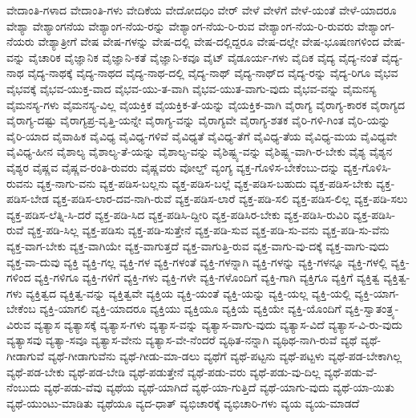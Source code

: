 {ವೇದಾಂತಿ-ಗಳಾದ
ವೇದಾಂತಿ-ಗಳು
ವೇದಿಕೆಯ
ವೇದೋದಧಿಂ
ವೇರ್
ವೇಳೆ
ವೇಳೆಗೆ
ವೇಳೆ-ಯಂತೆ
ವೇಳೆ-ಯಾದರೂ
ವೇಶ್ಯಾ
ವೇಶ್ಯಾಂಗನೆಯ
ವೇಶ್ಯಾಂಗ-ನೆಯ-ರನ್ನು
ವೇಶ್ಯಾಂಗ-ನೆಯ-ರಿ-ರುವ
ವೇಶ್ಯಾಂಗ-ನೆಯ-ರಿ-ರುವರು
ವೇಶ್ಯಾಂಗ-ನೆಯರು
ವೇಶ್ಯಾತ್ರೀಗೆ
ವೇಷ
ವೇಷ-ಗಳನ್ನು
ವೇಷ-ದಲ್ಲಿ
ವೇಷ-ದಲ್ಲಿದ್ದರೂ
ವೇಷ-ದಲ್ಲೇ
ವೇಷ-ಭೂಷಣಗಳಿಂದ
ವೇಷ-ವನ್ನು
ವೈಚಾರಿಕ
ವೈಜ್ಞಾನಿಕ
ವೈಜ್ಞಾನಿ-ಕತೆ
ವೈಜ್ಞಾನಿ-ಕವೂ
ವೈಟ್‌
ವೈಡೂರ್ಯ-ಗಳು
ವೈದಿಕ
ವೈದ್ಯ
ವೈದ್ಯ-ನಂತೆ
ವೈದ್ಯ-ನಾಥ
ವೈದ್ಯ-ನಾಥಕ್ಕೆ
ವೈದ್ಯ-ನಾಥದ
ವೈದ್ಯ-ನಾಥ-ದಲ್ಲಿ
ವೈದ್ಯ-ನಾಥ್
ವೈದ್ಯ-ನಾಥ್‌ದ
ವೈದ್ಯ-ರನ್ನು
ವೈದ್ಯ-ರಿಗೂ
ವೈಭವ
ವೈಭವಕ್ಕೆ
ವೈಭವ-ಯುಕ್ತ-ವಾದ
ವೈಭವ-ಯು-ತ-ವಾಗಿ
ವೈಭವ-ಯುತ-ವಾಗು-ವುದು
ವೈಭವ-ವನ್ನು
ವೈಮನಸ್ಯ
ವೈಮನಸ್ಯ-ಗಳು
ವೈಮನಸ್ಯ-ವಿಲ್ಲ
ವೈಯಕ್ತಿಕ
ವೈಯಕ್ತಿಕ-ತೆ-ಯನ್ನು
ವೈಯಕ್ತಿಕ-ವಾಗಿ
ವೈರಾಗ್ಯ
ವೈರಾಗ್ಯ-ಕಾರಕ
ವೈರಾಗ್ಯದ
ವೈರಾಗ್ಯ-ದಷ್ಟು
ವೈರಾಗ್ಯಪ್ರ-ವೃತ್ತಿ-ಯನ್ನೇ
ವೈರಾಗ್ಯ-ವನ್ನು
ವೈರಾಗ್ಯವೇ
ವೈರಾಗ್ಯ-ಶತಕ
ವೈರಿ-ಗಳಿ-ಗಿಂತ
ವೈರಿ-ಯನ್ನು
ವೈರಿ-ಯಾದ
ವೈವಾಹಿಕ
ವೈವಿಧ್ಯ
ವೈವಿಧ್ಯ-ಗಳಿವೆ
ವೈವಿಧ್ಯತೆ
ವೈವಿಧ್ಯ-ತೆಗೆ
ವೈವಿಧ್ಯ-ತೆಯ
ವೈವಿಧ್ಯ-ಮಯ
ವೈವಿಧ್ಯವೇ
ವೈವಿಧ್ಯ-ಹೀನ
ವೈಶಾಲ್ಯ
ವೈಶಾಲ್ಯ-ತೆ-ಯನ್ನು
ವೈಶಾಲ್ಯ-ವನ್ನು
ವೈಶಿಷ್ಟ್ಯ-ವನ್ನು
ವೈಶಿಷ್ಟ್ಯ-ವಾಗಿ-ರ-ಬೇಕು
ವೈಶ್ಯ
ವೈಶ್ಯನ
ವೈಶ್ಯರ
ವೈಷ್ಣವ
ವೈಷ್ಣವ-ರಂತಿ-ರುವರು
ವೈಷ್ಣವರು
ವೋಲ್ಡ್
ವ್ಯಂಗ್ಯ
ವ್ಯಕ್ತ-ಗೊಳಿಸ-ಬೇಕೆಂಬು-ದನ್ನು
ವ್ಯಕ್ತ-ಗೊಳಿಸಿ-ರುವನು
ವ್ಯಕ್ತ-ನಾಗು-ವನು
ವ್ಯಕ್ತ-ಪಡಿಸ-ಬಲ್ಲನು
ವ್ಯಕ್ತ-ಪಡಿಸ-ಬಲ್ಲೆ
ವ್ಯಕ್ತ-ಪಡಿಸ-ಬಹುದು
ವ್ಯಕ್ತ-ಪಡಿಸ-ಬೇಕು
ವ್ಯಕ್ತ-ಪಡಿಸ-ಬೇಡ
ವ್ಯಕ್ತ-ಪಡಿಸ-ಲಾರ-ದವ-ನಾಗಿ-ರುವೆ
ವ್ಯಕ್ತ-ಪಡಿಸ-ಲಾರೆ
ವ್ಯಕ್ತ-ಪಡಿ-ಸಲಿ
ವ್ಯಕ್ತ-ಪಡಿಸ-ಲಿಲ್ಲ
ವ್ಯಕ್ತ-ಪಡಿ-ಸಲು
ವ್ಯಕ್ತ-ಪಡಿಸ-ಲೆತ್ನಿ-ಸಿ-ದರೆ
ವ್ಯಕ್ತ-ಪಡಿ-ಸಿದ
ವ್ಯಕ್ತ-ಪಡಿಸಿ-ದ್ದೀರಿ
ವ್ಯಕ್ತ-ಪಡಿಸಿರ-ಬೇಕು
ವ್ಯಕ್ತ-ಪಡಿಸಿ-ರುವಿರಿ
ವ್ಯಕ್ತ-ಪಡಿಸಿ-ರುವೆ
ವ್ಯಕ್ತ-ಪಡಿ-ಸಿಲ್ಲ
ವ್ಯಕ್ತ-ಪಡಿಸು
ವ್ಯಕ್ತ-ಪಡಿ-ಸುತ್ತೇನೆ
ವ್ಯಕ್ತ-ಪಡಿ-ಸುವ
ವ್ಯಕ್ತ-ಪಡಿ-ಸು-ವನು
ವ್ಯಕ್ತ-ಪಡಿ-ಸು-ವೆನು
ವ್ಯಕ್ತ-ವಾಗ-ಬೇಕು
ವ್ಯಕ್ತ-ವಾಗಿಯೇ
ವ್ಯಕ್ತ-ವಾಗುತ್ತದೆ
ವ್ಯಕ್ತ-ವಾಗುತ್ತಿ-ರುವ
ವ್ಯಕ್ತ-ವಾಗು-ವು-ದಕ್ಕೆ
ವ್ಯಕ್ತ-ವಾಗು-ವುದು
ವ್ಯಕ್ತ-ವಾ-ದುವು
ವ್ಯಕ್ತಿ
ವ್ಯಕ್ತಿ-ಗಲ್ಲ
ವ್ಯಕ್ತಿ-ಗಳ
ವ್ಯಕ್ತಿ-ಗಳಂತೆ
ವ್ಯಕ್ತಿ-ಗಳನ್ನಾಗಿ
ವ್ಯಕ್ತಿ-ಗಳನ್ನು
ವ್ಯಕ್ತಿ-ಗಳನ್ನೂ
ವ್ಯಕ್ತಿ-ಗಳಲ್ಲಿ
ವ್ಯಕ್ತಿ-ಗಳಿಂದ
ವ್ಯಕ್ತಿ-ಗಳಿಗೂ
ವ್ಯಕ್ತಿ-ಗಳಿಗೆ
ವ್ಯಕ್ತಿ-ಗಳು
ವ್ಯಕ್ತಿ-ಗಳೇ
ವ್ಯಕ್ತಿ-ಗಳೊಂದಿಗೆ
ವ್ಯಕ್ತಿ-ಗಾಗಿ
ವ್ಯಕ್ತಿಗೂ
ವ್ಯಕ್ತಿಗೆ
ವ್ಯಕ್ತಿತ್ವ
ವ್ಯಕ್ತಿತ್ವ-ಗಳು
ವ್ಯಕ್ತಿತ್ವದ
ವ್ಯಕ್ತಿತ್ವ-ವನ್ನು
ವ್ಯಕ್ತಿತ್ವವೇ
ವ್ಯಕ್ತಿಯ
ವ್ಯಕ್ತಿ-ಯಂತೆ
ವ್ಯಕ್ತಿ-ಯನ್ನು
ವ್ಯಕ್ತಿ-ಯಲ್ಲ
ವ್ಯಕ್ತಿ-ಯಲ್ಲಿ
ವ್ಯಕ್ತಿ-ಯಾಗ-ಬೇಕೆಂಬ
ವ್ಯಕ್ತಿ-ಯಾಗಲಿ
ವ್ಯಕ್ತಿ-ಯಾದರೂ
ವ್ಯಕ್ತಿಯು
ವ್ಯಕ್ತಿಯೂ
ವ್ಯಕ್ತಿಯೆ
ವ್ಯಕ್ತಿಯೇ
ವ್ಯಕ್ತಿ-ಯೊಂದಿಗೆ
ವ್ಯಕ್ತಿ-ಸ್ವಾತಂತ್ರ್ಯ-ವಿರುವ
ವ್ಯತ್ಯಾಸ
ವ್ಯತ್ಯಾಸಕ್ಕೆ
ವ್ಯತ್ಯಾಸ-ಗಳು
ವ್ಯತ್ಯಾಸ-ವನ್ನು
ವ್ಯತ್ಯಾಸ-ವಾಗು-ವುದು
ವ್ಯತ್ಯಾಸ-ವಿದೆ
ವ್ಯತ್ಯಾಸ-ವಿ-ರು-ವುದು
ವ್ಯತ್ಯಾಸವು
ವ್ಯತ್ಯಾ-ಸವೂ
ವ್ಯತ್ಯಾಸ-ವೇನು
ವ್ಯತ್ಯಾಸ-ವೇ-ನೆಂದರೆ
ವ್ಯಥಿತ-ನನ್ನಾಗಿ
ವ್ಯಥಿಥ-ನಾಗಿ-ರುವೆ
ವ್ಯಥೆ
ವ್ಯಥೆ-ಗೀಡಾಗುವೆ
ವ್ಯಥೆ-ಗೀಡಾಗುವೆನು
ವ್ಯಥೆ-ಗೀಡು-ಮಾ-ಡಲು
ವ್ಯಥೆಗೆ
ವ್ಯಥೆ-ಪಟ್ಟನು
ವ್ಯಥೆ-ಪಟ್ಟಳು
ವ್ಯಥೆ-ಪಡ-ಬೇಕಾಗಿಲ್ಲ
ವ್ಯಥೆ-ಪಡ-ಬೇಕು
ವ್ಯಥೆ-ಪಡ-ಬೇಡಿ
ವ್ಯಥೆ-ಪಡುತ್ತೇನೆ
ವ್ಯಥೆ-ಪಡು-ವರು
ವ್ಯಥೆ-ಪಡು-ವು-ದಿಲ್ಲ
ವ್ಯಥೆ-ಪಡು-ವೆ-ನೆಂಬುದು
ವ್ಯಥೆ-ಪಡು-ವೆವು
ವ್ಯಥೆಯ
ವ್ಯಥೆ-ಯಾಗಿದೆ
ವ್ಯಥೆ-ಯಾ-ಗುತ್ತಿದೆ
ವ್ಯಥೆ-ಯಾಗು-ವುದು
ವ್ಯಥೆ-ಯಾ-ಯಿತು
ವ್ಯಥೆ-ಯುಂಟು-ಮಾಡಿತು
ವ್ಯಥೆಯೂ
ವ್ಯದ-ಧಾತ್
ವ್ಯಭಿಚಾರಕ್ಕೆ
ವ್ಯಭಿಚಾರಿ-ಗಳು
ವ್ಯಯ
ವ್ಯಯ-ಮಾಡದೆ
}
